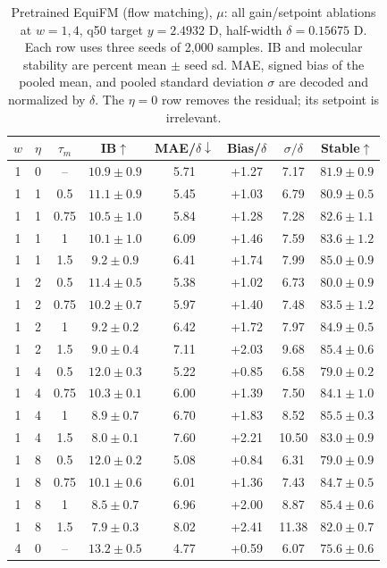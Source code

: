 \documentclass{article}
\begin{document}
\begin{table}[!htbp]
\centering\small
\caption{Pretrained EquiFM (flow matching), $\mu$: all gain/setpoint ablations at $w=1,4$, q50 target $y=2.4932$ D, half-width $\delta=0.15675$ D. Each row uses three seeds of 2,000 samples. IB and molecular stability are percent mean $\pm$ seed sd. MAE, signed bias of the pooled mean, and pooled standard deviation $\sigma$ are decoded and normalized by $\delta$. The $\eta=0$ row removes the residual; its setpoint is irrelevant.}
\label{tab:grid-equifm-mu}
\begin{tabular}{cccccccc}
\toprule
$w$ & $\eta$ & $\tau_m$ & IB$\uparrow$ & MAE/$\delta\downarrow$ & Bias/$\delta$ & $\sigma/\delta$ & Stable$\uparrow$\\
\midrule
1 & 0 & -- & $10.9\pm0.9$ & 5.71 & +1.27 & 7.17 & $81.9\pm0.9$\\
1 & 1 & 0.5 & $11.1\pm0.9$ & 5.45 & +1.03 & 6.79 & $80.9\pm0.5$\\
1 & 1 & 0.75 & $10.5\pm1.0$ & 5.84 & +1.28 & 7.28 & $82.6\pm1.1$\\
1 & 1 & 1 & $10.1\pm1.0$ & 6.09 & +1.46 & 7.59 & $83.6\pm1.2$\\
1 & 1 & 1.5 & $9.2\pm0.9$ & 6.41 & +1.74 & 7.99 & $85.0\pm0.9$\\
1 & 2 & 0.5 & $11.4\pm0.5$ & 5.38 & +1.02 & 6.73 & $80.0\pm0.9$\\
1 & 2 & 0.75 & $10.2\pm0.7$ & 5.97 & +1.40 & 7.48 & $83.5\pm1.2$\\
1 & 2 & 1 & $9.2\pm0.2$ & 6.42 & +1.72 & 7.97 & $84.9\pm0.5$\\
1 & 2 & 1.5 & $9.0\pm0.4$ & 7.11 & +2.03 & 9.68 & $85.4\pm0.6$\\
1 & 4 & 0.5 & $12.0\pm0.3$ & 5.22 & +0.85 & 6.58 & $79.0\pm0.2$\\
1 & 4 & 0.75 & $10.3\pm0.1$ & 6.00 & +1.39 & 7.50 & $84.1\pm1.0$\\
1 & 4 & 1 & $8.9\pm0.7$ & 6.70 & +1.83 & 8.52 & $85.5\pm0.3$\\
1 & 4 & 1.5 & $8.0\pm0.1$ & 7.60 & +2.21 & 10.50 & $83.0\pm0.9$\\
1 & 8 & 0.5 & $12.0\pm0.2$ & 5.08 & +0.84 & 6.31 & $79.0\pm0.9$\\
1 & 8 & 0.75 & $10.1\pm0.6$ & 6.01 & +1.36 & 7.43 & $84.7\pm0.5$\\
1 & 8 & 1 & $8.5\pm0.7$ & 6.96 & +2.00 & 8.87 & $85.4\pm0.6$\\
1 & 8 & 1.5 & $7.9\pm0.3$ & 8.02 & +2.41 & 11.38 & $82.0\pm0.7$\\
\midrule
4 & 0 & -- & $13.2\pm0.5$ & 4.77 & +0.59 & 6.07 & $75.6\pm0.6$\\

\end{tabular}
\end{table}
\end{document}
